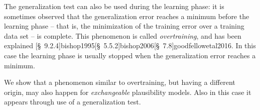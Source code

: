 \documentclass[\ifafour a4paper,12pt,\else a5paper,10pt,\fi%
onecolumn,oneside,article,%
british%
]{memoir}
\theoremstyle{remark}
\theoremstyle{innote}
\let\parentext=\parentexttrack%
\newcommand*{\citep}{\parencites}
\newcommand*{\citey}{\parencites*}
\newcommand*{\pf}{\mathrm{p}}%
\renewcommand*{\|}{\mathpunct{|}}
\newcommand*{\sect}{\S}%
\newcommand*{\sects}{\S\S}%
\newcommand*{\ptext}[1]{\text{\small #1}}
\begin{document}
The generalization test can also be used during the learning phase: it is
sometimes observed that the generalization error reaches a minimum before
the learning phase -- that is, the minimization of the training error over
a training data set -- is complete. This phenomenon is called
\emph{overtraining}, and has been explained
\cite{sjoebergetal1995,bishop1995b}[\sect~9.2.4]{bishop1995}[\sect~5.5.2]{bishop2006}[\sect~7.8]{goodfellowetal2016}.
In this case the learning phase is usually stopped when the generalization
error reaches a minimum.

\bigskip

We show that a phenomenon similar to overtraining, but having a different
origin, may also happen for \emph{exchangeable} plausibility models. Also
in this case it appears through use of a generalization test.




\end{document}

